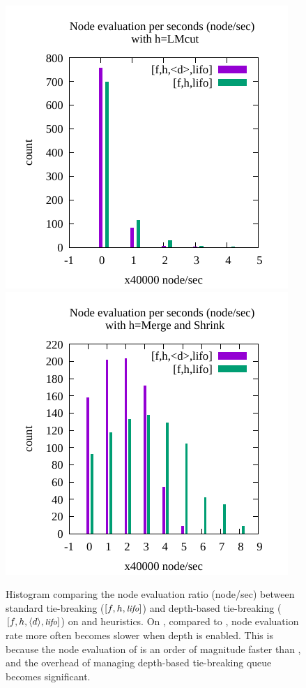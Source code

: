 \begin{figure}[htb]
 \centering
 \includegraphics[width=0.4\linewidth]{img/node-sec/lmhiL-lmh_L-hist.pdf}
 \includegraphics[width=0.4\linewidth]{img/node-sec/mnhiL-mnh_L-hist.pdf}
 \caption{Histogram comparing the node evaluation ratio (node/sec) between standard tie-breaking ($[f,h,{\small\textit{lifo}}]$) and
 depth-based tie-breaking ($[f,h,{\left<d\right>},{\small\textit{lifo}}]$) on \lmcut and \mands heuristics.
 On \mands, compared to \lmcut, node evaluation rate more often becomes
 slower when depth is enabled. This is because the node evaluation of \mands is an order of
 magnitude faster than \lmcut, and the overhead of managing depth-based tie-breaking queue becomes significant.
 }
 \label{fig:expansion-ratio-lifo}
\end{figure}

